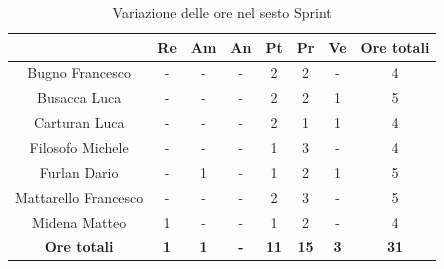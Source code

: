 \begin{table}[H]
  \centering
  \renewcommand{\arraystretch}{1.8}
  \begin{tabular}{c|c|c|c|c|c|c|c}
    \rowcolor[HTML]{125E28}
    \multicolumn{1}{c}{\color[HTML]{FFFFFF}\textbf{ Nominativo }}
                         & \multicolumn{1}{c}{\color[HTML]{FFFFFF}\textbf{ Re }}
                         & \multicolumn{1}{c}{\color[HTML]{FFFFFF}\textbf{ Am}}
                         & \multicolumn{1}{c}{\color[HTML]{FFFFFF}\textbf{ An }}
                         & \multicolumn{1}{c}{\color[HTML]{FFFFFF}\textbf{ Pt }}
                         & \multicolumn{1}{c}{\color[HTML]{FFFFFF}\textbf{ Pr }}
                         & \multicolumn{1}{c}{\color[HTML]{FFFFFF}\textbf{ Ve }}
                         & \multicolumn{1}{c}{\color[HTML]{FFFFFF}\textbf{ Ore totali }}                                                                                  \\
    \hline
    Bugno Francesco      & -                                                             & -          & -          & 2           & 2           & -          & 4           \\
    Busacca Luca         & -                                                             & -          & -          & 2           & 2           & 1          & 5           \\
    Carturan Luca        & -                                                             & -          & -          & 2           & 1           & 1          & 4           \\
    Filosofo Michele     & -                                                             & -          & -          & 1           & 3           & -          & 4           \\
    Furlan Dario         & -                                                             & 1          & -          & 1           & 2           & 1          & 5           \\
    Mattarello Francesco & -                                                             & -          & -          & 2           & 3           & -          & 5           \\
    Midena Matteo        & 1                                                             & -          & -          & 1           & 2           & -          & 4           \\
    \textbf{Ore totali}  & \textbf{1}                                                    & \textbf{1} & \textbf{-} & \textbf{11} & \textbf{15} & \textbf{3} & \textbf{31}
  \end{tabular}
  \caption{Variazione delle ore nel sesto Sprint}
\end{table}

